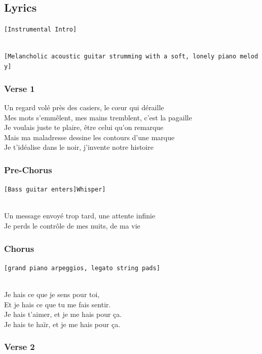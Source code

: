 \subsection{Lyrics}\label{lyrics-17}

\texttt{{[}Instrumental\ Intro{]}}\strut \\
\texttt{{[}Melancholic\ acoustic\ guitar\ strumming\ with\ a\ soft,\ lonely\ piano\ melody{]}}

\subsubsection{Verse 1}\label{verse-1-9}

Un regard volé près des casiers, le cœur qui déraille\\
Mes mots s'emmêlent, mes mains tremblent, c'est la pagaille\\
Je voulais juste te plaire, être celui qu'on remarque\\
Mais ma maladresse dessine les contours d'une marque\\
Je t'idéalise dans le noir, j'invente notre histoire

\subsubsection{Pre-Chorus}\label{pre-chorus-10}

\texttt{{[}Bass\ guitar\ enters{]}\textasciigrave{}\textasciigrave{}{[}Whisper{]}}\strut \\
Un message envoyé trop tard, une attente infinie\\
Je perds le contrôle de mes nuits, de ma vie

\subsubsection{Chorus}\label{chorus-24}

\texttt{{[}grand\ piano\ arpeggios,\ legato\ string\ pads{]}}\strut \\
Je hais ce que je sens pour toi,\\
Et je hais ce que tu me fais sentir.\\
Je hais t'aimer, et je me hais pour ça.\\
Je hais te haïr, et je me hais pour ça.

\subsubsection{Verse 2}\label{verse-2-10}

